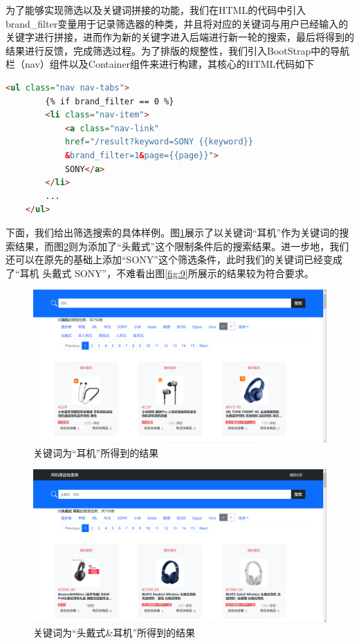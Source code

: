 \documentclass[a4paper,12pt]{article}
\begin{document}
    为了能够实现筛选以及关键词拼接的功能，我们在HTML的代码中引入brand\_filter变量用于记录筛选器的种类，并且将对应的关键词与用户已经输入的关键字进行拼接，进而作为新的关键字进入后端进行新一轮的搜索，最后将得到的结果进行反馈，完成筛选过程。为了排版的规整性，我们引入BootStrap中的导航栏（nav）组件以及Container组件来进行构建，其核心的HTML代码如下

    \begin{lstlisting}[language=html]
    <ul class="nav nav-tabs">
        {% if brand_filter == 0 %}
        <li class="nav-item">
            <a class="nav-link" 
            href="/result?keyword=SONY {{keyword}}
            &brand_filter=1&page={{page}}">
            SONY</a>
        </li>
        ...
    </ul>
    \end{lstlisting}

    下面，我们给出筛选搜索的具体样例。图\ref{fig:7}展示了以关键词“耳机”作为关键词的搜索结果，而图\ref{fig:8}则为添加了“头戴式”这个限制条件后的搜索结果。进一步地，我们还可以在原先的基础上添加“SONY”这个筛选条件，此时我们的关键词已经变成了“耳机 头戴式 SONY”，不难看出图\ref{fig:9}所展示的结果较为符合要求。

    \begin{figure}[H]
        \centering
        \includegraphics[scale=0.4]{pic/pic7.png}
        \caption{关键词为“耳机”所得到的结果}
        \label{fig:7}
    \end{figure}

    \begin{figure}[H]
        \centering
        \includegraphics[scale=0.4]{pic/pic8.png}
        \caption{关键词为“头戴式\&耳机”所得到的结果}
        \label{fig:8}
    \end{figure}
\end{document}
